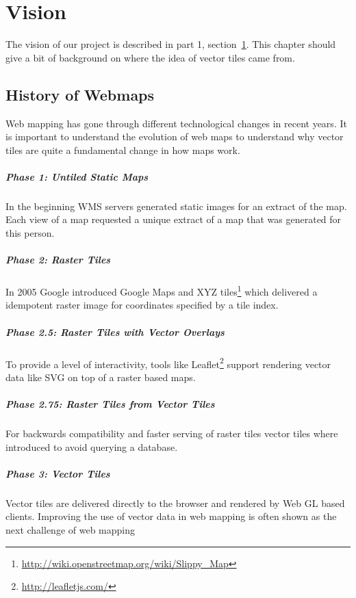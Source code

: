 \chapter{Vision}\label{vision}

The vision of our project is described in part 1, section~\ref{vision}. This chapter should give a bit of background on where the idea of vector tiles came from.

\section{History of Webmaps}
\label{history-of-webmaps}

Web mapping has gone through different technological changes in recent years. It is important to understand the evolution of web maps to understand why vector tiles are quite a fundamental change in how maps work.

\paragraph{Phase 1: Untiled Static
Maps}

In the beginning WMS servers generated static images for an extract
of the map. Each view of a map requested a unique extract of a map that was generated for this person.

\paragraph{Phase 2: Raster Tiles}

In 2005 Google introduced Google Maps and XYZ 
tiles\footnote{\url{http://wiki.openstreetmap.org/wiki/Slippy_Map}}
which delivered a idempotent raster image for coordinates specified by a
tile index.

\paragraph{Phase 2.5: Raster Tiles with Vector
Overlays}

To provide a level of interactivity, tools like
Leaflet\footnote{\url{http://leafletjs.com/}} support rendering vector
data like SVG on top of a raster based maps.

\paragraph{Phase 2.75: Raster Tiles from Vector
Tiles}

For backwards compatibility and faster serving of raster tiles vector
tiles where introduced to avoid querying a database.

\paragraph{Phase 3: Vector Tiles}

Vector tiles are delivered directly to the browser and rendered by Web
GL based clients.
\newline{}
Improving the use of vector data in web mapping is often shown as the next challenge
of web mapping \cite[p.~88]{gaffuri2012toward} 
